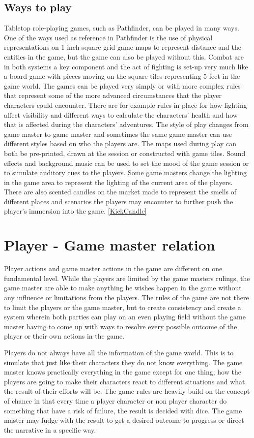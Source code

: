 \subsection*{Ways to play}
Tabletop role-playing games, such as Pathfinder, can be played in many ways.
One of the ways used as reference in Pathfinder is the use of physical representations on 1 inch square grid game maps to represent distance and the entities in the game, but the game can also be played without this. 
Combat are in both systems a key component and the act of fighting is set-up very much like a board game with pieces moving on the square tiles representing 5 feet in the game world. 
The games can be played very simply or with more complex rules that represent some of the more advanced circumstances that the player characters could encounter. 
There are for example rules in place for how lighting affect visibility and different ways to calculate the characters' health and how that is affected during the characters' adventures. 
The style of play changes from game master to game master and sometimes the same game master can use different styles based on who the players are. 
The maps used during play can both be pre-printed, drawn at the session or constructed with game tiles.
Sound effects and background music can be used to set the mood of the game session or to simulate auditory cues to the players.
Some game masters change the lighting in the game area to represent the lighting of the current area of the players.
There are also scented candles on the market made to represent the smells of different places and scenarios the players may encounter to further push the player's immersion into the game. \ref{KickCandle}

\section*{Player - Game master relation}
Player actions and game master actions in the game are different on one fundamental level. While the players are limited by the game masters rulings, the game master are able to make anything he wishes happen in the game without any influence or limitations from the players. The rules of the game are not there to limit the players or the game master, but to create consistency and create a system wherein both parties can play on an even playing field without the game master having to come up with ways to resolve every possible outcome of the player or their own actions in the game.

Players do not always have all the information of the game world. This is to simulate that just like their characters they do not know everything. The game master knows practically everything in the game except for one thing; how the players are going to make their characters react to different situations and what the result of their efforts will be. The game rules are heavily build on the concept of chance in that every time a player character or non player character do something that have a risk of failure, the result is decided with dice. The game master may fudge with the result to get a desired outcome to progress or direct the narrative in a specific way.

